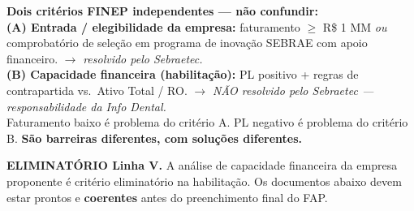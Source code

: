 \documentclass[11pt, a4paper]{article}
\newcommand{\destaque}[2]{%
    \vspace{2pt}
    \colorbox{#1!10}{%
        \parbox{\dimexpr\textwidth-2\fboxsep}{%
            \small #2%
        }%
    }
    \vspace{4pt}
}
\begin{document}
\destaque{primaryColor}{%
    \textcolor{primaryColor}{\textbf{Dois critérios FINEP independentes --- não confundir:}} \\[2pt]
    \textbf{(A) Entrada / elegibilidade da empresa:} faturamento $\geq$ R\$ 1 MM \emph{ou} comprobatório de seleção em programa de inovação SEBRAE com apoio financeiro. \textcolor{successGreen}{$\to$ \emph{resolvido pelo Sebraetec.}} \\
    \textbf{(B) Capacidade financeira (habilitação):} PL positivo + regras de contrapartida vs.\ Ativo Total / RO. \textcolor{accentColor}{$\to$ \emph{NÃO resolvido pelo Sebraetec --- responsabilidade da Info Dental.}}\\[2pt]
    Faturamento baixo é problema do critério A. PL negativo é problema do critério B. \textbf{São barreiras diferentes, com soluções diferentes.}%
}

\destaque{accentColor}{%
    \textcolor{accentColor}{\textbf{ELIMINATÓRIO Linha V.}} A análise de capacidade financeira da empresa proponente é critério eliminatório na habilitação. Os documentos abaixo devem estar prontos e \textbf{coerentes} antes do preenchimento final do FAP.%
}
\end{document}
